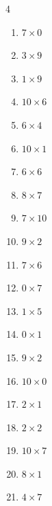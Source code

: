 \begin{multicols}{4}
\begin{enumerate}
  \item $7\times 0$
        \phantom{$=0$}

  \item $3\times 9$
        \phantom{$=27$}

  \item $1\times 9$
        \phantom{$=9$}

  \item $10\times 6$
        \phantom{$=60$}

  \item $6\times 4$
        \phantom{$=24$}

  \item $10\times 1$
        \phantom{$=10$}

  \item $6\times 6$
        \phantom{$=36$}

  \item $8\times 7$
        \phantom{$=56$}

  \item $7\times 10$
        \phantom{$=70$}

\columnbreak %

  \item $9\times 2$
        \phantom{$=18$}

  \item $7\times 6$
        \phantom{$=42$}

  \item $0\times 7$
        \phantom{$=0$}

  \item $1\times 5$
        \phantom{$=5$}

  \item $0\times 1$
        \phantom{$=0$}

  \item $9\times 2$
        \phantom{$=18$}

  \item $10\times 0$
        \phantom{$=0$}

  \item $2\times 1$
        \phantom{$=2$}

  \item $2\times 2$
        \phantom{$=4$}

  \item $10\times 7$
        \phantom{$=70$}

  \item $8\times 1$
        \phantom{$=8$}

  \item $4\times 7$
        \phantom{$=28$}


\end{enumerate}
\end{multicols}
